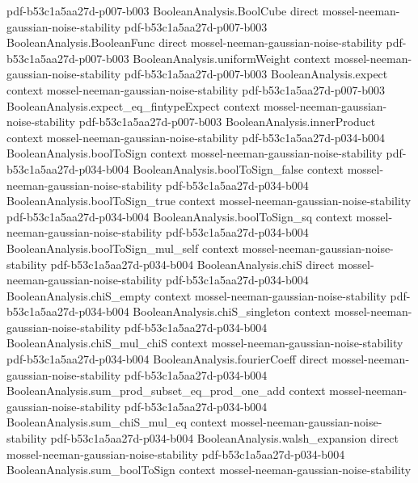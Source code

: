 \begin{theorem}
  {pdf-b53c1a5aa27d-p007-b003}
\proofstep
  {BooleanAnalysis.BoolCube}
  {direct}
  {mossel-neeman-gaussian-noise-stability}
  {pdf-b53c1a5aa27d-p007-b003}
\proofstep
  {BooleanAnalysis.BooleanFunc}
  {direct}
  {mossel-neeman-gaussian-noise-stability}
  {pdf-b53c1a5aa27d-p007-b003}
\proofstep
  {BooleanAnalysis.uniformWeight}
  {context}
  {mossel-neeman-gaussian-noise-stability}
  {pdf-b53c1a5aa27d-p007-b003}
\proofstep
  {BooleanAnalysis.expect}
  {context}
  {mossel-neeman-gaussian-noise-stability}
  {pdf-b53c1a5aa27d-p007-b003}
\proofstep
  {BooleanAnalysis.expect_eq_fintypeExpect}
  {context}
  {mossel-neeman-gaussian-noise-stability}
  {pdf-b53c1a5aa27d-p007-b003}
\proofstep
  {BooleanAnalysis.innerProduct}
  {context}
  {mossel-neeman-gaussian-noise-stability}
  {pdf-b53c1a5aa27d-p034-b004}
\proofstep
  {BooleanAnalysis.boolToSign}
  {context}
  {mossel-neeman-gaussian-noise-stability}
  {pdf-b53c1a5aa27d-p034-b004}
\proofstep
  {BooleanAnalysis.boolToSign_false}
  {context}
  {mossel-neeman-gaussian-noise-stability}
  {pdf-b53c1a5aa27d-p034-b004}
\proofstep
  {BooleanAnalysis.boolToSign_true}
  {context}
  {mossel-neeman-gaussian-noise-stability}
  {pdf-b53c1a5aa27d-p034-b004}
\proofstep
  {BooleanAnalysis.boolToSign_sq}
  {context}
  {mossel-neeman-gaussian-noise-stability}
  {pdf-b53c1a5aa27d-p034-b004}
\proofstep
  {BooleanAnalysis.boolToSign_mul_self}
  {context}
  {mossel-neeman-gaussian-noise-stability}
  {pdf-b53c1a5aa27d-p034-b004}
\proofstep
  {BooleanAnalysis.chiS}
  {direct}
  {mossel-neeman-gaussian-noise-stability}
  {pdf-b53c1a5aa27d-p034-b004}
\proofstep
  {BooleanAnalysis.chiS_empty}
  {context}
  {mossel-neeman-gaussian-noise-stability}
  {pdf-b53c1a5aa27d-p034-b004}
\proofstep
  {BooleanAnalysis.chiS_singleton}
  {context}
  {mossel-neeman-gaussian-noise-stability}
  {pdf-b53c1a5aa27d-p034-b004}
\proofstep
  {BooleanAnalysis.chiS_mul_chiS}
  {context}
  {mossel-neeman-gaussian-noise-stability}
  {pdf-b53c1a5aa27d-p034-b004}
\proofstep
  {BooleanAnalysis.fourierCoeff}
  {direct}
  {mossel-neeman-gaussian-noise-stability}
  {pdf-b53c1a5aa27d-p034-b004}
\proofstep
  {BooleanAnalysis.sum_prod_subset_eq_prod_one_add}
  {context}
  {mossel-neeman-gaussian-noise-stability}
  {pdf-b53c1a5aa27d-p034-b004}
\proofstep
  {BooleanAnalysis.sum_chiS_mul_eq}
  {context}
  {mossel-neeman-gaussian-noise-stability}
  {pdf-b53c1a5aa27d-p034-b004}
\proofstep
  {BooleanAnalysis.walsh_expansion}
  {direct}
  {mossel-neeman-gaussian-noise-stability}
  {pdf-b53c1a5aa27d-p034-b004}
\proofstep
  {BooleanAnalysis.sum_boolToSign}
  {context}
  {mossel-neeman-gaussian-noise-stability}

\end{theorem}
